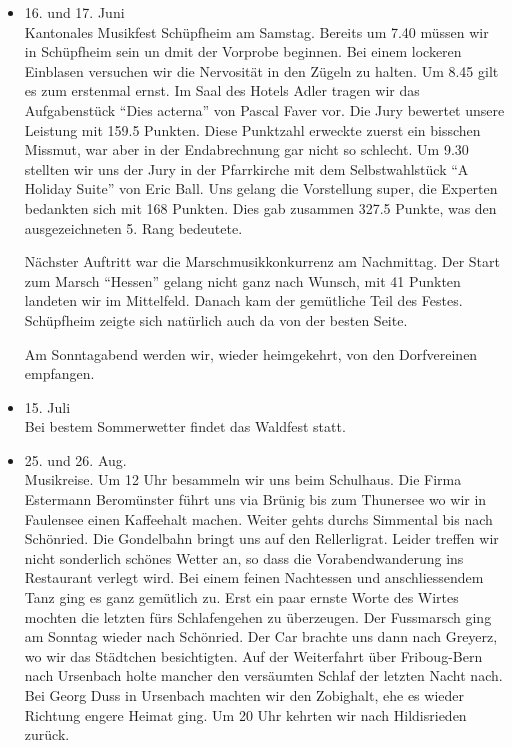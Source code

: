 \begin{history}
\begin{itemize}
        \item[]16. und 17. Juni\\
        Kantonales Musikfest Schüpfheim am Samstag. Bereits um 7.40 müssen wir
        in Schüpfheim sein un dmit der Vorprobe beginnen. Bei einem lockeren
        Einblasen versuchen wir die Nervosität in den Zügeln zu halten. Um 8.45
        gilt es zum erstenmal ernst. Im Saal des Hotels Adler tragen wir das
        Aufgabenstück \enquote{Dies acterna} von Pascal Faver vor. Die Jury
        bewertet unsere Leistung mit 159.5 Punkten. Diese Punktzahl erweckte
        zuerst ein bisschen Missmut, war aber in der Endabrechnung gar nicht so
        schlecht. Um 9.30 stellten wir uns der Jury in der Pfarrkirche mit dem
        Selbstwahlstück \enquote{A Holiday Suite} von Eric Ball. Uns gelang die
        Vorstellung super, die Experten bedankten sich mit 168 Punkten. Dies gab
        zusammen 327.5 Punkte, was den ausgezeichneten 5. Rang bedeutete.

        Nächster Auftritt war die Marschmusikkonkurrenz am Nachmittag. Der Start
        zum Marsch \enquote{Hessen} gelang nicht ganz nach Wunsch, mit 41
        Punkten landeten wir im Mittelfeld. Danach kam der gemütliche Teil des
        Festes. Schüpfheim zeigte sich natürlich auch da von der besten Seite.

        Am Sonntagabend werden wir, wieder heimgekehrt, von den Dorfvereinen
        empfangen.

        \item[]15. Juli\\
        Bei bestem Sommerwetter findet das Waldfest statt.

        \item[]25. und 26. Aug.\\
        Musikreise. Um 12 Uhr besammeln wir uns beim Schulhaus. Die Firma
        Estermann Beromünster führt uns via Brünig bis zum Thunersee wo wir in
        Faulensee einen Kaffeehalt machen. Weiter gehts durchs Simmental bis
        nach Schönried. Die Gondelbahn bringt uns auf den Rellerligrat. Leider
        treffen wir nicht sonderlich schönes Wetter an, so dass die
        Vorabendwanderung ins Restaurant verlegt wird. Bei einem feinen
        Nachtessen und anschliessendem Tanz ging es ganz gemütlich zu. Erst ein
        paar ernste Worte des Wirtes mochten die letzten fürs Schlafengehen zu
        überzeugen. Der Fussmarsch ging am Sonntag wieder nach Schönried. Der
        Car brachte uns dann nach Greyerz, wo wir das Städtchen besichtigten.
        Auf der Weiterfahrt über Friboug-Bern nach Ursenbach holte mancher den
        versäumten Schlaf der letzten Nacht nach. Bei Georg Duss in Ursenbach
        machten wir den Zobighalt, ehe es wieder Richtung engere Heimat ging. Um
        20 Uhr kehrten wir nach Hildisrieden zurück.


    \end{itemize}

\end{history}
